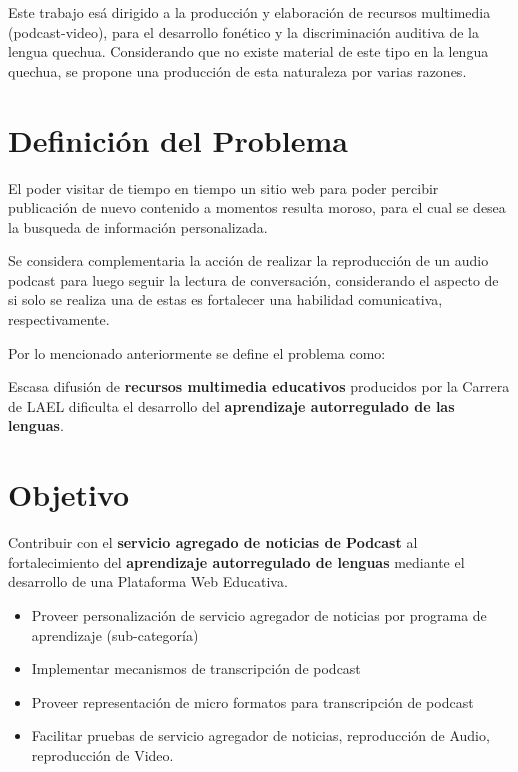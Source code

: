 Este trabajo es\'{a} dirigido a la producci\'{o}n y elaboraci\'{o}n de recursos
multimedia (podcast-video), para el desarrollo fon\'{e}tico y la discriminaci\'{o}n
auditiva de la lengua quechua. Considerando que no existe material de este tipo en
la lengua quechua, se propone una producci\'{o}n de esta naturaleza por varias 
razones.\cite{CGL2015}

\section{Definici\'{o}n del Problema}

El poder visitar de tiempo en tiempo un sitio web para poder percibir 
publicaci\'{o}n de nuevo contenido a momentos resulta moroso, para el cual
se desea la busqueda de informaci\'{o}n personalizada.

Se considera complementaria la acci\'{o}n de realizar la reproducci\'{o}n
de un audio podcast para luego seguir la lectura de conversaci\'{o}n, 
considerando el aspecto de si solo se realiza una de estas es fortalecer una
habilidad comunicativa, respectivamente.

Por lo mencionado anteriormente se define el problema como:

Escasa difusi\'{o}n de \textbf{recursos multimedia educativos} producidos por 
la Carrera de LAEL dificulta el desarrollo del \textbf{aprendizaje 
autorregulado de las lenguas}.

\section{Objetivo}

Contribuir con el \textbf{servicio agregado de noticias de Podcast} al 
fortalecimiento del \textbf{aprendizaje autorregulado de lenguas} mediante el 
desarrollo de una Plataforma Web Educativa.

\begin{itemize}

\item Proveer personalizaci\'{o}n de servicio agregador de noticias por programa de
aprendizaje (sub-categor\'{i}a)

\item Implementar mecanismos de transcripci\'{o}n de podcast

\item Proveer representaci\'{o}n de micro formatos para transcripci\'{o}n de podcast

\item Facilitar pruebas de servicio agregador de noticias, reproducci\'{o}n de
Audio, reproducci\'{o}n de Video.

\end{itemize}

